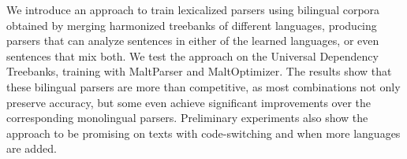 We introduce an approach to train lexicalized parsers using bilingual corpora obtained by merging harmonized treebanks of different languages, producing parsers that can analyze sentences in either of the learned languages, or even sentences that mix both. We test the approach on the Universal Dependency Treebanks, training with MaltParser and MaltOptimizer. The results show that these bilingual parsers are more than competitive, as most combinations not only preserve accuracy, but some even achieve significant improvements over the corresponding monolingual parsers. Preliminary experiments also show the approach to be promising on texts with code-switching and when more languages are added.
